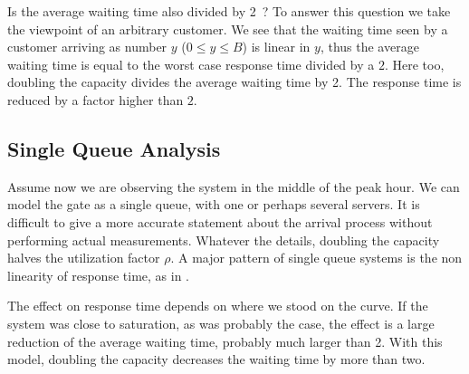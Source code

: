 Is the average waiting time also divided by 2~?
To answer this question we take the viewpoint of
an arbitrary customer. We see that the waiting
time seen by a customer arriving as number $y$
($0\leq y \leq B$) is linear in $y$, thus the
average waiting time is equal to the worst case
response time divided by a $2$. Here too,
doubling the capacity divides the average waiting
time by 2.
%
%
%
%
%
{The
response time is reduced by a factor higher than
$2$.}

\subsection{Single Queue Analysis}
Assume now we are observing the system in the
middle of the peak hour. We can model the gate as
a single queue, with one or perhaps several
servers. It is difficult to give a more accurate
statement about the arrival process without
performing actual measurements. Whatever the
details, doubling the capacity halves the
utilization factor $\rho$. A major pattern of
single queue systems is the non linearity of
response time, as in .%

The effect on response time depends on where
we stood on the curve. If the system was close to
saturation, as was probably the case, the effect
is a large reduction of the average waiting time,
probably much larger than 2. With this model,
doubling the capacity decreases the waiting time
by more than two.


